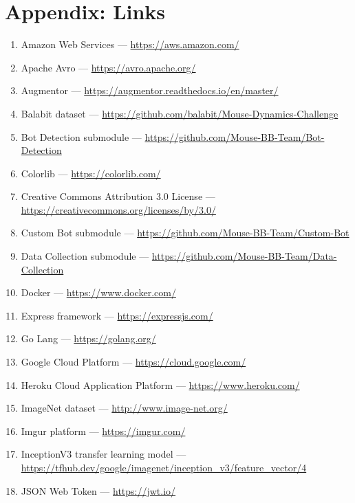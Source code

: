 \thispagestyle{plain}
\section*{Appendix: Links}\label{sec:links}
\begin{enumerate}
    \item Amazon Web Services --- \url{https://aws.amazon.com/}\label{itm:aws}
    \item Apache Avro --- \url{https://avro.apache.org/}\label{itm:avro}
    \item Augmentor --- \url{https://augmentor.readthedocs.io/en/master/}\label{itm:augmentor}
    \item Balabit dataset --- \url{https://github.com/balabit/Mouse-Dynamics-Challenge}\label{itm:balabit}
    \item Bot Detection submodule --- \url{https://github.com/Mouse-BB-Team/Bot-Detection}\label{itm:bot-detection}
    \item Colorlib --- \url{https://colorlib.com/}\label{itm:colorlib}
    \item Creative Commons Attribution 3.0 License --- \url{https://creativecommons.org/licenses/by/3.0/}\label{itm:license}
    \item Custom Bot submodule --- \url{https://github.com/Mouse-BB-Team/Custom-Bot}\label{itm:custom-bot}
    \item Data Collection submodule --- \url{https://github.com/Mouse-BB-Team/Data-Collection}\label{itm:data-collection}
    \item Docker --- \url{https://www.docker.com/}\label{itm:docker}
    \item Express framework --- \url{https://expressjs.com/}\label{itm:express}
    \item Go Lang --- \url{https://golang.org/}\label{itm:golang}
    \item Google Cloud Platform --- \url{https://cloud.google.com/}\label{itm:gcp}
    \item Heroku Cloud Application Platform --- \url{https://www.heroku.com/}\label{itm:heroku}
    \item ImageNet dataset --- \url{http://www.image-net.org/}\label{itm:image-net}
    \item Imgur platform --- \url{https://imgur.com/}\label{itm:imgur}
    \item InceptionV3 transfer learning model --- \url{https://tfhub.dev/google/imagenet/inception_v3/feature_vector/4}\label{itm:inceptionV3}
    \item JSON Web Token --- \url{https://jwt.io/}\label{itm:jwt}

\end{enumerate}
